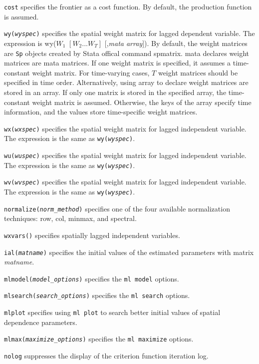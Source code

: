 \hangpara
{\tt cost} specifies the frontier as a cost function. By default, the production function is assumed.

\hangpara
{\tt wy({\it wyspec})} specifies the spatial weight matrix for lagged dependent variable. The expression is wy($W_1$ $ [W_2 ... W_T]$ [,{\it mata array}]).  By default, the weight matrices are {\tt Sp} objects created by Stata offical command spmatrix. mata declares weight matrices are mata matrices. If one weight matrix is specified, it assumes a time-constant weight matrix. For time-varying cases, $T$ weight matrices should be specified in time order. Alternatively, using array to declare weight matrices are stored in an array.  If only one matrix is stored in the specified array, the time-constant weight matrix is assumed.  Otherwise, the keys of the array specify time information, and the values store time-specific weight matrices.

\hangpara
{\tt wx({\it wxspec})} specifies the spatial weight matrix for lagged independent variable. The expression is the same as {\tt wy({\it wyspec})}.

\hangpara
{\tt wu({\it wuspec})} specifies the spatial weight matrix for lagged independent variable. The expression is the same as {\tt wy({\it wyspec})}.

\hangpara
{\tt wv({\it wvspec})} specifies the spatial weight matrix for lagged independent variable. The expression is the same as {\tt wy({\it wyspec})}.

\hangpara
{\tt normalize({\it norm\_method})} specifies  one of the four available normalization techniques: row, col, minmax, and spectral.

\hangpara
{\tt wxvars(\varlist)} specifies spatially lagged independent variables.


\hangpara
{\tt {}ial({\it matname})} specifies  the initial values of the estimated parameters with matrix {\it matname}.

\hangpara
{\tt mlmodel({\it model\_options})} specifies the  {\tt ml model} options.

\hangpara
{\tt mlsearch({\it search\_options})} specifies the  {\tt ml search} options.

\hangpara
{\tt mlplot} specifies using  {\tt ml plot} to search better initial values of spatial dependence parameters.

\hangpara
{\tt mlmax({\it maximize\_options})} specifies the  {\tt ml maximize} options.

\hangpara
{\tt nolog} suppresses the display of the criterion function iteration log.


